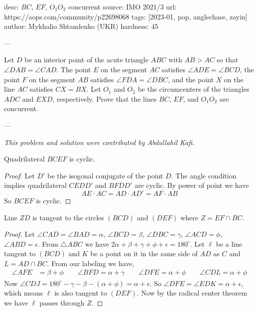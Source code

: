 desc: $BC$, $EF$, $O_1O_2$ concurrent
source: IMO 2021/3
url: https://aops.com/community/p22698068
tags: [2023-01, pop, anglechase, zayin]
author: Mykhalio Shtandenko (UKR)
hardness: 45

---

Let $D$ be an interior point of the acute triangle $ABC$
with $AB > AC$ so that $\angle DAB = \angle CAD$.
The point $E$ on the segment $AC$ satisfies $\angle ADE =\angle BCD$,
the point $F$ on the segment $AB$ satisfies $\angle FDA =\angle DBC$,
and the point $X$ on the line $AC$ satisfies $CX = BX$.
Let $O_1$ and $O_2$ be the circumcenters of the triangles
$ADC$ and $EXD$, respectively.
Prove that the lines $BC$, $EF$, and $O_1O_2$ are concurrent.

---

\emph{This problem and solution were contributed by Abdullahil Kafi}.


\begin{claim*}
    Quadrilateral $BCEF$ is cyclic.
\end{claim*}

\begin{proof}
    Let $D'$ be the isogonal conjugate of the point $D$. The
    angle condition implies quadrilateral $CEDD'$ and $BFDD'$
    are cyclic. By power of point we have \[ AE\cdot AC=AD\cdot AD'=AF\cdot AB \]
    So $BCEF$ is cyclic.
\end{proof}

\begin{claim*}
    Line $ZD$ is tangent to the circles $(BCD)$ and $(DEF)$
    where $Z=EF\cap BC$.
\end{claim*}

\begin{proof}
    Let $\angle CAD=\angle BAD=\alpha$, $\angle BCD=\beta$,
    $\angle DBC=\gamma$, $\angle ACD=\phi$,
    $\angle ABD=\epsilon$.
    From $\triangle ABC$ we have
    $2\alpha+\beta+\gamma+\phi+\epsilon=180^\circ$.
    Let $\ell$ be a line tangent to $(BCD)$ and $K$ be a
    point on it in the same side of $AD$ as $C$ and
    $L=AD\cap BC$. From our labeling we have,
    \begin{align*}
	    \angle AFE &= \beta + \phi \qquad \angle BFD =
	    \alpha + \gamma \qquad \angle DFE = \alpha + \phi
	    \qquad \angle CDL = \alpha + \phi
    \end{align*}
    Now $\angle CDJ = 180^\circ - \gamma - \beta - (\alpha + \phi) = \alpha + \epsilon$.
    So $\angle DFE = \angle EDK = \alpha + \epsilon$, which
    means $\ell$ is also tangent to $(DEF)$. Now by the
    radical center theorem we have $\ell$ passes through
    $Z$.
\end{proof}

